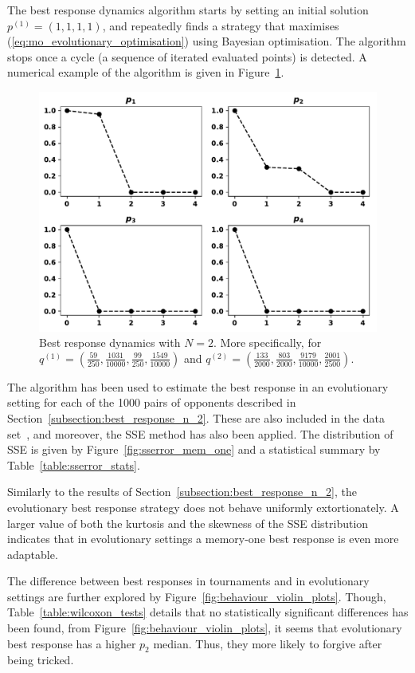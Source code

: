 The best response dynamics algorithm starts by setting an initial
solution \(p^{(1)}=(1, 1, 1, 1)\), and repeatedly finds a strategy that maximises
(\ref{eq:mo_evolutionary_optimisation}) using Bayesian optimisation. The
algorithm stops once a cycle (a sequence of iterated evaluated points) is
detected. A numerical example of the algorithm is given in Figure~\ref{fig:best_response_dynamics_results}.

\begin{figure}[!htbp]
    \centering
    \includegraphics[width=.6\textwidth]{src/chapters/05/paper/Memory-size-in-the-prisoners-dilemma/img/evolution_example_two.pdf}
    \caption{Best response dynamics with \(N=2\). More specifically, for
    \(q ^{(1)}=(\frac{59}{250},
                \frac{1031}{10000},
                \frac{99}{250},
                \frac{1549}{10000})\) and
    \(q ^{(2)}=(\frac{133}{2000},
                \frac{803}{2000},
                \frac{9179}{10000},
                \frac{2001}{2500})\).}
\label{fig:best_response_dynamics_results}
\end{figure}

The algorithm has been used to estimate the best response in an evolutionary
setting for each of the 1000 pairs of opponents described in
Section~\ref{subsection:best_response_n_2}. These are also included in the data
set~\cite{glynatsi2019}, and moreover, the SSE method has also been applied. The
distribution of SSE is given by Figure~\ref{fig:sserror_mem_one} and a
statistical summary by Table~\ref{table:sserror_stats}.

Similarly to the results of Section~\ref{subsection:best_response_n_2}, the
evolutionary best response strategy does not behave uniformly extortionately. A
larger value of both the kurtosis and the skewness of the SSE distribution
indicates that in evolutionary settings a memory-one best response is even more
adaptable.

The difference between best responses in tournaments and in evolutionary
settings are further explored by Figure~\ref{fig:behaviour_violin_plots}.
Though, Table~\ref{table:wilcoxon_tests} details that no statistically
significant differences has been found, from
Figure~\ref{fig:behaviour_violin_plots}, it seems that evolutionary best
response has a higher $p_2$ median. Thus, they more likely to forgive after
being tricked.


